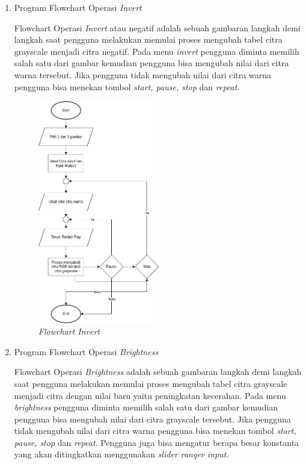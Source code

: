 \begin{enumerate}[leftmargin=1cm, itemindent=0.6cm,labelwidth=15pt, labelsep=5pt, listparindent=1cm,align=left]
\begin{enumerate}[leftmargin=1cm, itemindent=0.6cm,labelwidth=15pt, labelsep=5pt, listparindent=1cm,align=left]
\begin{enumerate}[leftmargin=1cm, itemindent=0.6cm,labelwidth=15pt, labelsep=5pt, listparindent=1cm,align=left]
    \item Program Flowchart Operasi \textit{Invert}

        Flowchart Operasi \textit{Invert} atau negatif adalah sebuah gambaran langkah demi langkah saat pengguna melakukan memulai proses mengubah tabel citra grayscale menjadi citra negatif. Pada menu \textit{invert} pengguna diminta memilih salah satu dari gambar kemudian pengguna bisa mengubah nilai dari citra warna tersebut. Jika pengguna tidak mengubah nilai dari citra warna pengguna bisa menekan tombol \textit{start, pause, stop} dan \textit{repeat}.


      \begin{figure}[ht]
          \includegraphics[width=0.5\textwidth, center]{images/flowchart-grayscale.png}
          \caption{\textit{Flowchart Invert}}
      \end{figure}

    \item Program Flowchart Operasi \textit{Brightness}

    Flowchart Operasi \textit{Brightness} adalah sebuah gambaran langkah demi langkah saat pengguna melakukan memulai proses mengubah tabel citra grayscale menjadi citra dengan nilai baru yaitu peningkatan kecerahan. Pada menu \textit{brightness} pengguna diminta memilih salah satu dari gambar kemudian pengguna bisa mengubah nilai dari citra grayscale tersebut. Jika pengguna tidak mengubah nilai dari citra warna pengguna bisa menekan tombol \textit{start, pause, stop} dan \textit{repeat}. Pengguna juga bisa mengatur berapa besar konstanta yang akan ditingkatkan menggunakan \textit{slider ranger input}.


\end{enumerate}
\end{enumerate}
\end{enumerate}
